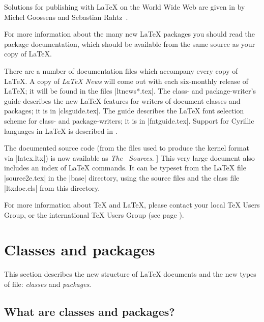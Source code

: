 \documentclass{ltxguide}[2001/05/28]
\begin{document}
Solutions for publishing with \LaTeX{} on the World Wide Web are given
in \emph{\LaTeXWcomp} by Michel Goossens and Sebastian
Rahtz~\cite{A-W:GR99}.

For more information about the many new \LaTeX{} packages you should
read the package documentation, which should be available from the
same source as your copy of \LaTeX.

There are a number of documentation files which accompany every copy
of \LaTeX.  A copy of \emph{\LaTeX{} News} will come out with each
six-monthly release of \LaTeX; it will be found in the files
|ltnews*.tex|.  The class- and package-writer's guide \emph{\clsguide}
describes the new \LaTeX{} features for writers of document classes
and packages; it is in |clsguide.tex|.  The guide \emph{\fntguide}
describes the \LaTeX{} font selection scheme for class- and
package-writers; it is in |fntguide.tex|. Support for Cyrillic languages
in \LaTeX{} is described in \emph{\cyrguide}.

The documented source code (from the files used to produce the kernel
format via |latex.ltx|) is now available as
\emph{The \LaTeXe\ Sources}.  ]
This very large document also includes an index of
\LaTeX{} commands.  It can be typeset from the \LaTeX{} file
|source2e.tex| in the |base| directory, using the source files and
the class file |ltxdoc.cls| from this directory.

For more information about \TeX{} and \LaTeX{}, please contact your
local \TeX{} Users Group, or the international \TeX{} Users Group (see
page \pageref{addrs}).


\section{Classes and packages}
\label{Sec:class+packages}

This section describes the new structure of \LaTeX{} documents and the
new types of file: \emph{classes} and \emph{packages}.

\subsection{What are classes and packages?}
\end{document}
